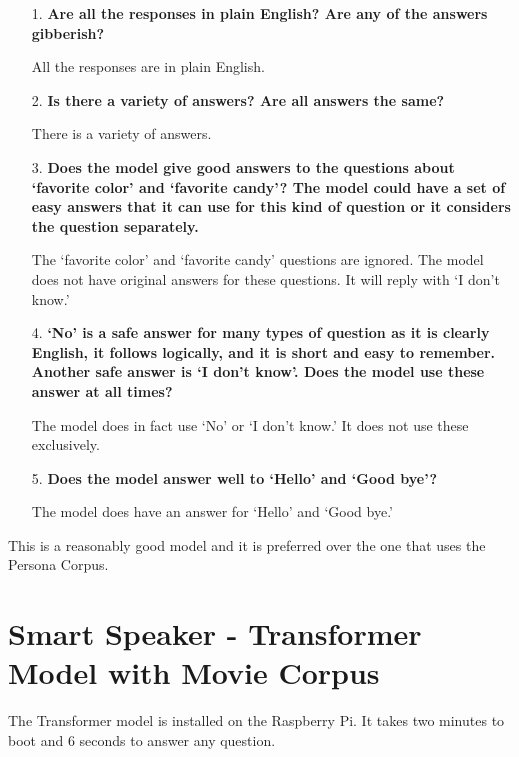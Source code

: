 \begin{itemize}
	\item [1.] \textbf{Are all the responses in plain English? Are any of the answers gibberish?}
	
	\item []All the responses are in plain English. 
	
	\item [2.] \textbf{Is there a  variety of answers? Are all answers the same?}
	
	\item []There is a variety of answers. 
	
	\item [3.] \textbf{Does the model give good answers to the questions about `favorite color' and `favorite candy'? The model could have a set of easy answers that it can use for this kind of question or it considers the question separately. }
	
	\item []The `favorite color' and `favorite candy' questions are ignored. The model does not have original answers for these questions. It will reply with `I don't know.'
	
	\item [4.] \textbf{`No' is a safe answer for many types of question as it is clearly English, it follows logically, and it is short and easy to remember. Another safe answer is `I don't know'. Does the model use these answer at all times?}
	
	\item []The model does in fact use `No' or `I don't know.' It does not use these exclusively.
	
	\item [5.] \textbf{Does the model answer well to `Hello' and `Good bye'?}
	
	\item []The model does have an answer for `Hello' and `Good bye.'
\end{itemize}

This is a reasonably good model and it is preferred over the one that uses the Persona Corpus.

\section{Smart Speaker - Transformer Model with Movie Corpus}

The Transformer model is installed on the Raspberry Pi. It takes two minutes to boot and 6 seconds to answer any question. %

